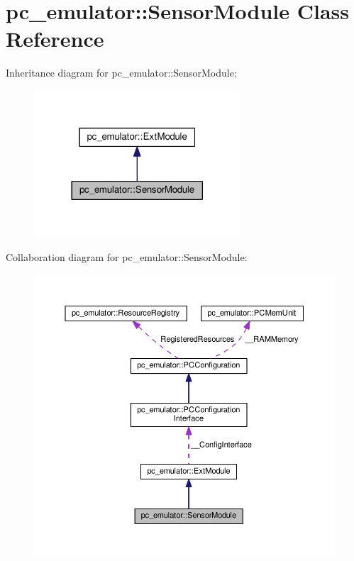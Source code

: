\hypertarget{classpc__emulator_1_1SensorModule}{}\section{pc\+\_\+emulator\+:\+:Sensor\+Module Class Reference}
\label{classpc__emulator_1_1SensorModule}


Inheritance diagram for pc\+\_\+emulator\+:\+:Sensor\+Module\+:
\nopagebreak
\begin{figure}[H]
\begin{center}
\leavevmode
\includegraphics[width=218pt]{classpc__emulator_1_1SensorModule__inherit__graph}
\end{center}
\end{figure}


Collaboration diagram for pc\+\_\+emulator\+:\+:Sensor\+Module\+:
\nopagebreak
\begin{figure}[H]
\begin{center}
\leavevmode
\includegraphics[width=350pt]{classpc__emulator_1_1SensorModule__coll__graph}
\end{center}
\end{figure}
